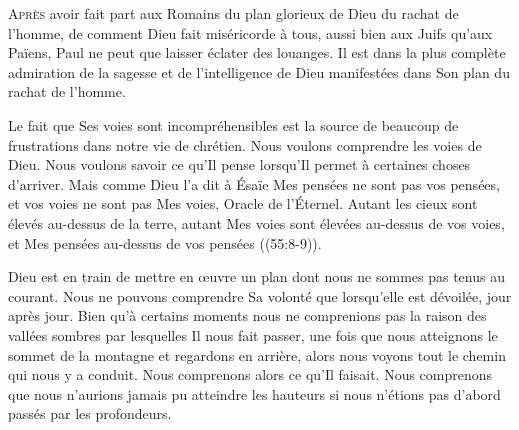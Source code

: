 



\lettrine{A}{près} avoir fait part aux Romains
 du plan glorieux de Dieu du rachat de l'homme,
 de comment Dieu fait miséricorde à tous,
 aussi bien aux Juifs qu'aux Païens,
 Paul ne peut que laisser éclater des louanges.
 Il est dans la plus complète admiration de la sagesse
 et de l'intelligence de Dieu manifestées
 dans Son plan du rachat de l'homme.


Le fait que \Og Ses voies sont incompréhensibles \Fg{}
 est la source de beaucoup de frustrations dans notre vie de chrétien. 
 Nous voulons comprendre les voies de Dieu. Nous voulons savoir ce qu'Il pense
 lorsqu'Il permet à certaines choses d'arriver.
 Mais comme Dieu l'a dit à Ésaïe\frcolon{} 
 \Og Mes pensées ne sont pas vos pensées, et vos voies ne sont pas Mes voies,
 \ocadr Oracle de l'Éternel. Autant les cieux sont élevés au-dessus
 de la terre, autant Mes voies sont élevées au-dessus de vos voies,
 et Mes pensées au-dessus de vos pensées \Fg{}
 ((55:8-9)).

Dieu est en train de mettre en \oe{}uvre un plan dont nous ne sommes
 pas tenus au courant. Nous ne pouvons comprendre Sa volonté
 que lorsqu'elle est dévoilée, jour après jour.
 Bien qu'à certains moments nous ne comprenions pas la raison
 des vallées sombres par lesquelles Il nous fait passer,
 une fois que nous atteignons le sommet de la montagne
 et regardons en arrière, alors nous voyons tout le chemin
 qui nous y a conduit. Nous comprenons alors ce qu'Il faisait.
 Nous comprenons que nous n'aurions jamais pu atteindre
 les hauteurs si nous n'étions pas d'abord passés par les profondeurs.

\dvrule



